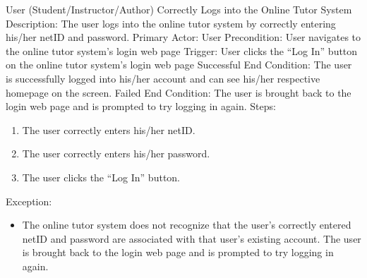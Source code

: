     \begin{section}{User (Student/Instructor/Author) Correctly Logs into the Online Tutor System}
        Description: The user logs into the online tutor system by correctly entering his/her netID and password. \newline
        Primary Actor: User \newline
        Precondition: User navigates to the online tutor system’s login web page \newline
        Trigger: User clicks the “Log In” button on the online tutor system’s login web page \newline
        Successful End Condition: The user is successfully logged into his/her account and can see his/her respective homepage on the screen. \newline
        Failed End Condition: The user is brought back to the login web page and is prompted to try logging in again. \newline
        \newline
        Steps:
        \begin{enumerate}
            \item{The user correctly enters his/her netID.}
            \item{The user correctly enters his/her password.}
            \item{The user clicks the “Log In” button.}
        \end{enumerate}
        Exception:
        \begin{itemize}
            \item{The online tutor system does not recognize that the user’s correctly entered netID and password are associated with that user’s existing account.
            The user is brought back to the login web page and is prompted to try logging in again.}
        \end{itemize}
    \end{section}
    
